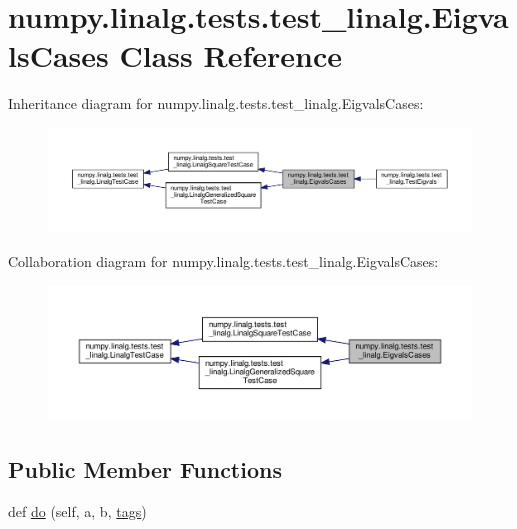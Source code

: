 \hypertarget{classnumpy_1_1linalg_1_1tests_1_1test__linalg_1_1EigvalsCases}{}\section{numpy.\+linalg.\+tests.\+test\+\_\+linalg.\+Eigvals\+Cases Class Reference}
\label{classnumpy_1_1linalg_1_1tests_1_1test__linalg_1_1EigvalsCases}


Inheritance diagram for numpy.\+linalg.\+tests.\+test\+\_\+linalg.\+Eigvals\+Cases\+:
\nopagebreak
\begin{figure}[H]
\begin{center}
\leavevmode
\includegraphics[width=350pt]{classnumpy_1_1linalg_1_1tests_1_1test__linalg_1_1EigvalsCases__inherit__graph}
\end{center}
\end{figure}


Collaboration diagram for numpy.\+linalg.\+tests.\+test\+\_\+linalg.\+Eigvals\+Cases\+:
\nopagebreak
\begin{figure}[H]
\begin{center}
\leavevmode
\includegraphics[width=350pt]{classnumpy_1_1linalg_1_1tests_1_1test__linalg_1_1EigvalsCases__coll__graph}
\end{center}
\end{figure}
\subsection*{Public Member Functions}
\begin{DoxyCompactItemize}
\item 
def \hyperlink{classnumpy_1_1linalg_1_1tests_1_1test__linalg_1_1EigvalsCases_a3a6e45fc25771ebb5f9cd0cab31e4b73}{do} (self, a, b, \hyperlink{namespacenumpy_1_1linalg_1_1tests_1_1test__linalg_ac6a064918e74d701a7b5aac0ffefe1e7}{tags})
\end{DoxyCompactItemize}
